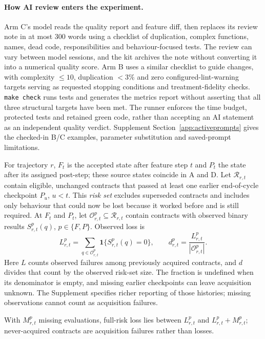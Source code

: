 \paragraph{How AI review enters the experiment.}
Arm C's model reads the quality report and feature diff, then
replaces its review note in at most 300 words using a checklist of
duplication, complex functions, names, dead code, responsibilities and
behaviour-focused tests. The review can vary between model sessions, and the kit archives the note without converting it into a numerical quality score. Arm B uses a similar checklist to guide changes, with complexity $\leq10$, duplication $<3\%$ and zero configured-lint-warning
targets serving as requested stopping conditions and treatment-fidelity checks.
\texttt{make check} runs tests and generates the metrics report without
asserting that all three structural targets have been met.
The runner enforces the time budget, protected tests and retained green
code, rather than accepting an AI statement as an independent quality verdict.
Supplement Section~\ref{app:activeprompts} gives the checked-in B/C examples, parameter substitution and saved-prompt limitations.

For trajectory $r$, $F_t$ is the accepted state after feature step $t$ and
$P_t$ the state after its assigned post-step; these source states coincide
in A and D. Let $\mathcal{R}_{r,t}$ contain eligible, unchanged contracts
that passed at least one earlier end-of-cycle checkpoint $P_u$, $u<t$.
This \emph{risk set} excludes superseded contracts and includes only behaviour that could now be lost because it worked before and is still required. At $F_t$ and $P_t$, let
$\mathcal{O}^{p}_{r,t}\subseteq\mathcal{R}_{r,t}$ contain contracts with
observed binary results $S^p_{r,t}(q)$, $p\in\{F,P\}$. Observed loss is
\begin{equation}
L^p_{r,t}=\sum_{q\in\mathcal{O}^{p}_{r,t}}
\mathbf{1}\{S^p_{r,t}(q)=0\},\qquad
d^p_{r,t}=\frac{L^p_{r,t}}{|\mathcal{O}^{p}_{r,t}|}.
\label{eq:decayloss}
\end{equation}
Here $L$ counts observed failures among previously acquired contracts, and
$d$ divides that count by the observed risk-set size. The fraction is undefined when its denominator is empty, and missing earlier checkpoints can leave acquisition unknown. The Supplement specifies richer reporting of those histories; missing observations cannot count as acquisition failures.

With $M^p_{r,t}$ missing evaluations, full-risk loss lies between
$L^p_{r,t}$ and $L^p_{r,t}+M^p_{r,t}$; never-acquired contracts are
acquisition failures rather than losses.


